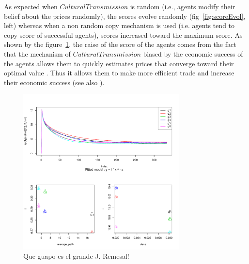 \documentclass[a1paper,landscape,showframe,fontscale=.42]{baposter}
\begin{document}
\begin{poster}
{\begin{multicols}{2}
As expected when $CulturalTransmission$ is random (i.e., agents modify their belief about the prices randomly), the scores evolve randomly (fig~\ref{fig:scoreEvol}, left) whereas when a non random copy mechanism is used (i.e. agents tend to copy score of successful agents), scores increased toward the maximum score.
\vfil
\columnbreak
As shown by the figure~\ref{fig:ratioEvol}, the raise of the score of the agents comes from the fact that the mechanism of $CulturalTransmission$ biased by the economic success of the agents allows them to quickly estimates prices that converge toward their optimal value . Thus it allows them to make more efficient trade and increase their economic success (see also \cite{gintis_emergence_2006}).
\vspace{-.3cm}
\begin{figure}[H]
    \center
		\includegraphics[width=8.5cm]{img/meanCurveAndFit.pdf}
	\caption{ \small
	    Que guapo es el grande J. Remesal!}
	\label{fig:ratioEvol}
\end{figure}
	\end{multicols}

}





\end{poster}
\end{document}
